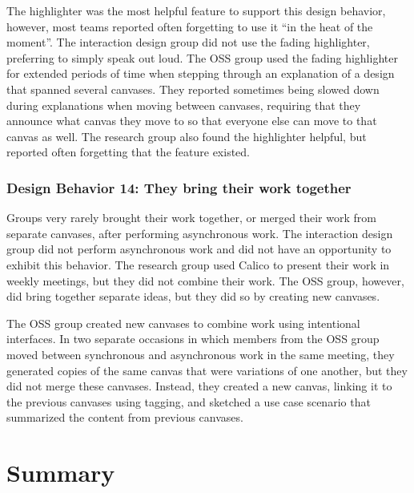 \documentclass[12pt,fleqn]{ucithesis}
\begin{document}
The highlighter was the most helpful feature to support this design behavior, however, most teams reported often forgetting to use it ``in the heat of the moment''. The interaction design group did not use the fading highlighter, preferring to simply speak out loud. The OSS group used the fading highlighter for extended periods of time when stepping through an explanation of a design that spanned several canvases. They reported sometimes being slowed down during explanations when moving between canvases, requiring that they announce what canvas they move to so that everyone else can move to that canvas as well. The research group also found the highlighter helpful, but reported often forgetting that the feature existed.

\subsubsection{Design Behavior 14: They bring their work together}

Groups very rarely brought their work together, or merged their work from separate canvases, after performing asynchronous work. The interaction design group did not perform asynchronous work and did not have an opportunity to exhibit this behavior. The research group used Calico to present their work in weekly meetings, but they did not combine their work. The OSS group, however, did bring together separate ideas, but they did so by creating new canvases. 

The OSS group created new canvases to combine work using intentional interfaces. In two separate occasions in which members from the OSS group moved between synchronous and asynchronous work in the same meeting, they generated copies of the same canvas that were variations of one another, but they did not merge these canvases. Instead, they created a new canvas, linking it to the previous canvases using tagging, and sketched a use case scenario that summarized the content from previous canvases. 


\section{Summary}
\label{chapter:evaluation:summary}
\end{document}
